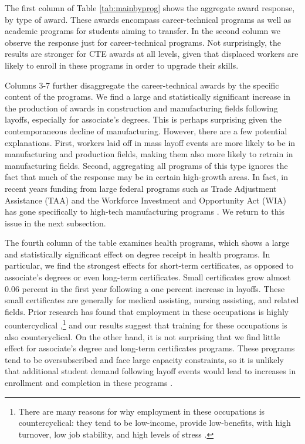 The first column of Table \ref{tab:mainbyprog} shows the aggregate award response, by type of award. These awards encompass career-technical programs as well as academic programs for students aiming to transfer. In the second column we observe the response just for career-technical programs. Not surprisingly, the results are stronger for CTE awards at all levels, given that displaced workers are likely to enroll in these programs in order to upgrade their skills. 

Columns 3-7 further disaggregate the career-technical awards by the specific content of the programs. We find a large and statistically significant increase in the production of awards in construction and manufacturing fields following layoffs, especially for associate's degrees. This is perhaps surprising given the contemporaneous decline of manufacturing. However, there are a few potential explanations. First, workers laid off in mass layoff events are more likely to be in manufacturing and production fields,  making them also more likely to retrain in manufacturing fields. Second, aggregating all programs of this type ignores the fact that much of the response may be in certain high-growth areas. In fact, in recent years funding from large federal programs such as Trade Adjustment Assistance (TAA) and the Workforce Investment and Opportunity Act (WIA) has gone specifically to high-tech manufacturing programs \citep{wioa2014, eyster2017taaccct}. We return to this issue in the next subsection.

The fourth column of the table examines health programs, which shows a large and statistically significant effect on degree receipt in health programs. In particular, we find the strongest effects for short-term certificates, as opposed to associate's degrees or even long-term certificates. Small certificates grow almost 0.06 percent in the first year following a one percent increase in layoffs. These small certificates are generally for medical assisting, nursing assisting, and related fields. Prior research has found that employment in these occupations is highly countercyclical \citep{SMPF2015, BS2012},\footnote{There are many reasons for why employment in these occupations is countercyclical: they tend to be low-income, provide low-benefits, with high turnover, low job stability, and high levels of stress \citep{BH1996, Yamada2002}.} and our results suggest that training for these occupations is also counteryclical. On the other hand, it is not surprising that we find little effect for associate's degree and long-term certificates programs. These programs tend to be oversubscribed and face large capacity constraints, so it is unlikely that additional student demand following layoff events would lead to increases in enrollment and completion in these programs \citep{Kuehn2007}.

